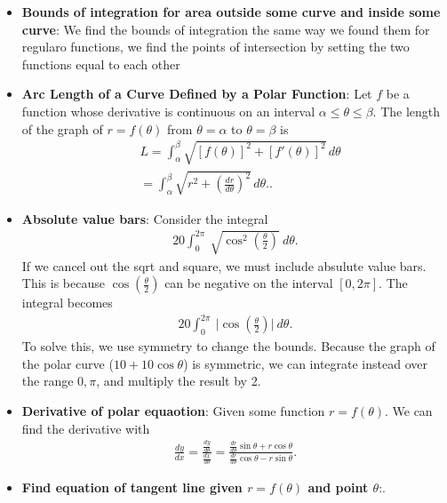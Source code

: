 \documentclass{report}
\begin{document}
\begin{itemize}
        \item \textbf{Bounds of integration for area outside some curve and inside some curve}: We find the bounds of integration the same way we found them for regularo functions, we find the points of intersection by setting the two functions equal to each other
        \item \textbf{Arc Length of a Curve Defined by a Polar Function}:
            Let \( f \) be a function whose derivative is continuous on an interval \( \alpha \leq \theta \leq \beta \). The length of the graph of \( r = f(\theta) \) from \( \theta = \alpha \) to \( \theta = \beta \) is
            \begin{align*}
              &L = \int_{\alpha}^{\beta} \sqrt{[f(\theta)]^2 + [f'(\theta)]^2} \, d\theta \\
              &= \int_{\alpha}^{\beta} \sqrt{r^2 + \left(\frac{dr}{d\theta}\right)^2} \, d\theta. 
          .\end{align*}
        \item \textbf{Absolute value bars}: Consider the integral
            \begin{align*}
                20 \int_{0}^{2\pi}\ \sqrt{\cos^{2}{\left(\frac{\theta }{2}\right)}}\ d\theta 
            .\end{align*}
            If we cancel out the sqrt and square, we must include absulute value bars. This is because $\cos{\left(\frac{\theta }{2}\right)}$ can be negative on the interval $[0,2\pi]$. The integral becomes
            \begin{align*}
                20 \int_{0}^{2\pi}\ \bigg\lvert \cos{\left(\frac{\theta}{2}\right)} \bigg\rvert\ d\theta 
            .\end{align*}
            To solve this, we use symmetry to change the bounds. Because the graph of the polar curve ($10+10\cos{\theta}$) is symmetric, we can integrate instead over the range $0,\pi$, and multiply the result by 2.
        \item \textbf{Derivative of polar equaotion}: Given some function $r=f(\theta )$. We can find the derivative with
            \begin{align*}
                \frac{dy}{dx} = \frac{\frac{dy}{d\theta}}{\frac{dx}{d\theta}} = \frac{\frac{dr}{d\theta }\sin{\theta } + r\cos{\theta }}{\frac{dr}{d\theta }\cos{\theta } - r\sin{\theta}}
            .\end{align*}
        \item \textbf{Find equation of tangent line given $r = f(\theta )$ and point $\theta$}:. 

\end{itemize}
\end{document}
